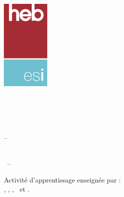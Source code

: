 

\thispagestyle{empty}

\includegraphics[scale=0.45]{image/logo-esi}
\begin{minipage}[t]{7cm}
\vspace{-6.5\baselineskip}
\sffamily
\large\textbf{\ecole\\\entite}
\\\vspace{3.5mm}\\
\large\entiteadresse\\\entitetel{} – \entitemail
\end{minipage}
%
\begin{minipage}[t]{5cm}
\vspace{-6.5\baselineskip}
\sffamily
\raggedleft
\large\textbf{\etude}
\end{minipage}


\vfill
\begin{center}
\sffamily
\Huge\cours
\bigskip\\
\Large\ue\ -- \annee
\end{center}
\vfill

Activité d'apprentissage enseignée par :
\\\auteura, \auteurb, \auteurc, \auteurd\ et \auteure.


